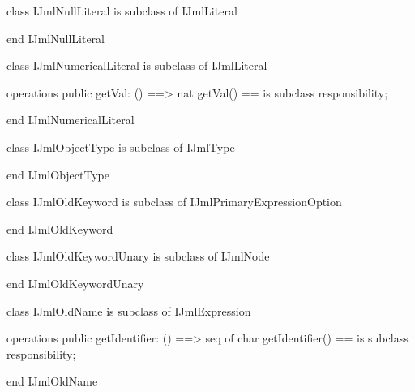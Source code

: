\begin{vdm_al}
class IJmlNullLiteral
 is subclass of IJmlLiteral

end IJmlNullLiteral
\end{vdm_al}

\begin{vdm_al}
class IJmlNumericalLiteral
 is subclass of IJmlLiteral

operations
  public getVal: () ==> nat
  getVal() == is subclass responsibility;

end IJmlNumericalLiteral
\end{vdm_al}

\begin{vdm_al}
class IJmlObjectType
 is subclass of IJmlType

end IJmlObjectType
\end{vdm_al}

\begin{vdm_al}
class IJmlOldKeyword
 is subclass of IJmlPrimaryExpressionOption

end IJmlOldKeyword
\end{vdm_al}

\begin{vdm_al}
class IJmlOldKeywordUnary
 is subclass of IJmlNode

end IJmlOldKeywordUnary
\end{vdm_al}

\begin{vdm_al}
class IJmlOldName
 is subclass of IJmlExpression

operations
  public getIdentifier: () ==> seq of char
  getIdentifier() == is subclass responsibility;

end IJmlOldName
\end{vdm_al}

